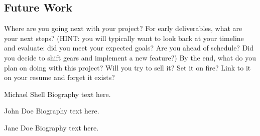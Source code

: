 \documentclass[10pt,conference,onecolumn,compsoc]{IEEEtran}
\begin{document}
\subsection{Future Work}
Where are you going next with your project?
For early deliverables, what are your next steps?  (HINT: you will typically want to look back at your timeline and evaluate: did you meet your expected goals?  Are you ahead of schedule?  Did you decide to shift gears and implement a new feature?)
By the end, what do you plan on doing with this project?  Will you try to sell it?  Set it on fire?  Link to it on your resume and forget it exists?







\begin{IEEEbiography}{Michael Shell}
Biography text here.
\end{IEEEbiography}

\begin{IEEEbiographynophoto}{John Doe}
Biography text here.
\end{IEEEbiographynophoto}


\begin{IEEEbiographynophoto}{Jane Doe}
Biography text here.
\end{IEEEbiographynophoto}





\end{document}
